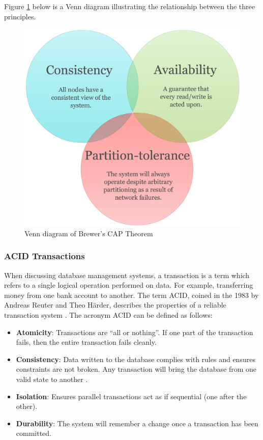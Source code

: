 Figure \ref{fig:venncap} below is a Venn diagram illustrating the relationship between the three principles.
\begin{figure}[h]\begin{center}\includegraphics[width=1\linewidth]{images/venncap}\caption{Venn diagram of Brewer's CAP Theorem}\label{fig:venncap}\end{center}\end{figure}

\subsubsection{ACID Transactions}\label{acid}
When discussing database management systems, a transaction is a term which refers to a single logical operation performed on data. For example, transferring money from one bank account to another. The term ACID, coined in the 1983 by Andreas Reuter and Theo Härder, describes the properties of a reliable transaction system \cite{acid}. The acronym ACID can be defined as follows:

\begin{itemize}
\item \textbf{Atomicity}: Transactions are ``all or nothing''. If one part of the transaction fails, then the entire transaction fails cleanly.
\item \textbf{Consistency}: Data written to the database complies with rules and ensures constraints are not broken. Any transaction will bring the database from one valid state to another \cite{acidtrans}.
\item \textbf{Isolation}: Ensures parallel transactions act as if sequential (one after the other).
\item \textbf{Durability}: The system will remember a change once a transaction has been committed.
\end{itemize}

